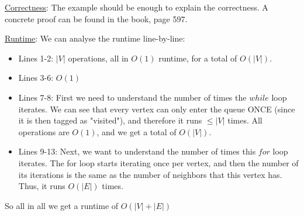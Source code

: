\underline{Correctness}: The example should be enough to explain the correctness. A concrete proof can be found in the book, page 597.

\underline{Runtime}: We can analyse the runtime line-by-line:
\begin{itemize}
\item Lines 1-2: $|V|$ operations, all in $O(1)$ runtime, for a total of $O(|V|)$.
\item Lines 3-6: $O(1)$
\item Lines 7-8: First we need to understand the number of times the $while$ loop iterates. We can see that every vertex can only enter the queue ONCE (since it is then tagged as "visited"), and therefore it runs $\leq |V|$ times. All operations are $O(1)$, and we get a total of $O(|V|)$. 
\item Lines 9-13: Next, we want to understand the number of times this $for$ loop iterates. 
The for loop starts iterating once per vertex, and then the number of its iterations is the same as the number of neighbors that this vertex has. Thus, it runs $O(|E|)$ times.
\end{itemize}
So all in all we get a runtime of $O(|V|+|E|)$



